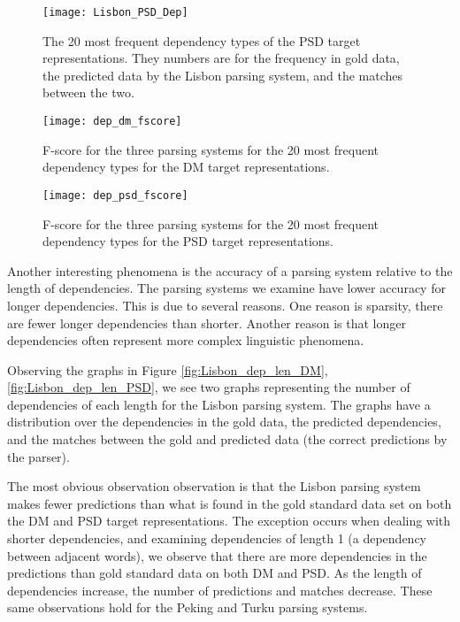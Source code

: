 \begin{figure}[h]
    \centering
    \begin{minipage}{0.8\textwidth}
        \centering
        \texttt{[image: Lisbon\_PSD\_Dep]}
    \end{minipage}
    \caption{The 20 most frequent dependency types of the PSD target representations. They numbers are for the frequency in gold data, the predicted data by the Lisbon parsing system, and the matches between the two.}
    \label{fig:lisbon_dep_PSD}
\end{figure}

\begin{figure}[h]
    \centering
    \begin{minipage}{0.8\textwidth}
        \centering
        \texttt{[image: dep\_dm\_fscore]}
    \end{minipage}\hfill
    \caption{F-score for the three parsing systems for the 20 most frequent dependency types for the DM target representations.}
    \label{fig:dep_fscore_DM}
\end{figure}

\begin{figure}[h]
    \centering
    \begin{minipage}{0.8\textwidth}
        \centering
        \texttt{[image: dep\_psd\_fscore]}
    \end{minipage}
    \caption{F-score for the three parsing systems for the 20 most frequent dependency types for the PSD target representations.}
    \label{fig:dep_fscore_PSD}
\end{figure}

Another interesting phenomena is the accuracy of a parsing system relative to the length of dependencies. The parsing systems we examine have lower accuracy for longer dependencies. This is due to several reasons. One reason is sparsity, there are fewer longer dependencies than shorter. Another reason is that longer dependencies often represent more complex linguistic phenomena.

Observing the graphs in Figure \ref{fig:Lisbon_dep_len_DM}, \ref{fig:Lisbon_dep_len_PSD}, we see two graphs representing the number of dependencies of each length for the Lisbon parsing system. The graphs have a distribution over the dependencies in the gold data, the predicted dependencies, and the matches between the gold and predicted data (the correct predictions by the parser).

The most obvious observation observation is that the Lisbon parsing system makes fewer predictions than what is found in the gold standard data set on both the DM and PSD target representations. The exception occurs when dealing with shorter dependencies, and examining dependencies of length 1 (a dependency between adjacent words), we observe that there are more dependencies in the predictions than gold standard data on both DM and PSD. As the length of dependencies increase, the number of predictions and matches decrease. These same observations hold for the Peking and Turku parsing systems.

